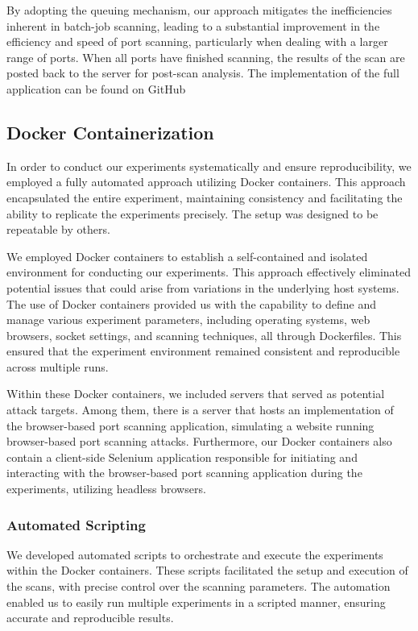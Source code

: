 By adopting the queuing mechanism, our approach mitigates the inefficiencies inherent in batch-job scanning, leading to a substantial improvement in the efficiency and speed of port scanning, particularly when dealing with a larger range of ports.
When all ports have finished scanning, the results of the scan are posted back to the server for post-scan analysis. The implementation of the full application can be found on GitHub~

\subsection{Docker Containerization}
\label{section:experiment-setup}

In order to conduct our experiments systematically and ensure reproducibility, we employed a fully automated approach utilizing Docker containers. 
This approach encapsulated the entire experiment, maintaining consistency and facilitating the ability to replicate the experiments precisely. 
The setup was designed to be repeatable by others.

We employed Docker containers to establish a self-contained and isolated environment for conducting our experiments. This approach effectively eliminated potential issues that could arise from variations in the underlying host systems.
The use of Docker containers provided us with the capability to define and manage various experiment parameters, including operating systems, web browsers, socket settings, and scanning techniques, all through Dockerfiles. This ensured that the experiment environment remained consistent and reproducible across multiple runs.

Within these Docker containers, we included servers that served as potential attack targets. Among them, there is a server that hosts an implementation of the browser-based port scanning application, simulating a website running browser-based port scanning attacks. Furthermore, our Docker containers also contain a client-side Selenium application responsible for initiating and interacting with the browser-based port scanning application during the experiments, utilizing headless browsers.

\subsubsection{Automated Scripting}

We developed automated scripts to orchestrate and execute the experiments within the Docker containers. These scripts facilitated the setup and execution of the scans, with precise control over the scanning parameters.
The automation enabled us to easily run multiple experiments in a scripted manner, ensuring accurate and reproducible results.

